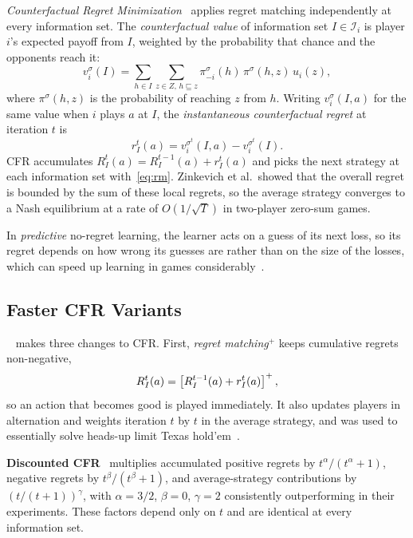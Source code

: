 \emph{Counterfactual Regret Minimization}~\cite{zinkevich2007regret} applies regret matching
independently at every information set. The \emph{counterfactual value} of information set
$I \in \mathcal{I}_i$ is player $i$'s expected payoff from $I$, weighted by the probability
that chance and the opponents reach it:
\begin{equation}
  v_i^\sigma(I) = \sum_{h\in I}\sum_{z\in Z,\,h\sqsubseteq z}
  \pi^\sigma_{-i}(h)\,\pi^\sigma(h,z)\,u_i(z),
\end{equation}
where $\pi^\sigma(h,z)$ is the probability of reaching $z$ from $h$. Writing $v_i^\sigma(I,a)$
for the same value when $i$ plays $a$ at $I$, the \emph{instantaneous counterfactual regret}
at iteration $t$ is
\begin{equation}
  r^t_I(a) = v_i^{\sigma^t}(I,a) - v_i^{\sigma^t}(I).
  \label{eq:instregret}
\end{equation}
CFR accumulates $R^t_I(a) = R^{t-1}_I(a) + r^t_I(a)$ and picks the next strategy at each
information set with~\eqref{eq:rm}. Zinkevich et al.\ showed that the overall regret is bounded
by the sum of these local regrets, so the average strategy converges to a Nash equilibrium at a
rate of $O(1/\sqrt{T})$ in two-player zero-sum games.

In \emph{predictive} no-regret learning, the learner acts on a guess of its next loss, so its
regret depends on how wrong its guesses are rather than on the size of the losses, which can
speed up learning in games considerably~\cite{rakhlin2013optimization, syrgkanis2015fast}.

\subsection{Faster CFR Variants}
\label{sec:variants}

\textbf{\cfrp{}}~\cite{tammelin2015solving} makes three changes to CFR. First,
\emph{regret matching$^+$} keeps cumulative regrets non-negative,
\begin{equation}
  R^t_I(a) = \left[R^{t-1}_I(a) + r^t_I(a)\right]^{+},
  \label{eq:rmplus}
\end{equation}
so an action that becomes good is played immediately. It also updates players in alternation
and weights iteration $t$ by $t$ in the average strategy, and was used to essentially solve
heads-up limit Texas hold'em~\cite{bowling2015heads}.

\textbf{Discounted CFR}~\cite{brown2019solving} multiplies accumulated positive regrets by
$t^\alpha/(t^\alpha+1)$, negative regrets by $t^\beta/(t^\beta+1)$, and average-strategy
contributions by $(t/(t+1))^\gamma$, with $\alpha=3/2$, $\beta=0$, $\gamma=2$ consistently
outperforming \cfrp{} in their experiments. These factors depend only on $t$ and are identical at every information
set.

